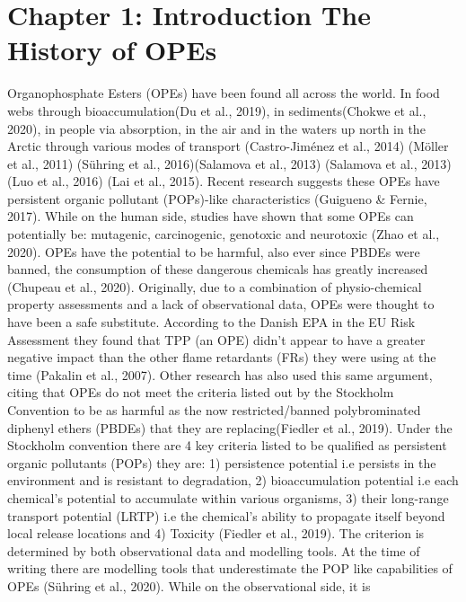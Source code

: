 \documentclass[journal=jacsat,manuscript=article]{achemso}
\begin{document}
\hypertarget{chapter-1-introduction-the-history-of-opes}{%
\section{Chapter 1: Introduction The History of
OPEs}\label{chapter-1-introduction-the-history-of-opes}}

Organophosphate Esters (OPEs) have been found all across the world. In
food webs through bioaccumulation(Du et al., 2019), in sediments(Chokwe
et al., 2020), in people via absorption, in the air and in the waters up
north in the Arctic through various modes of transport (Castro-Jiménez
et al., 2014) (Möller et al., 2011) (Sühring et al., 2016)(Salamova et
al., 2013) (Salamova et al., 2013) (Luo et al., 2016) (Lai et al.,
2015). Recent research suggests these OPEs have persistent organic
pollutant (POPs)-like characteristics (Guigueno \& Fernie, 2017). While
on the human side, studies have shown that some OPEs can potentially be:
mutagenic, carcinogenic, genotoxic and neurotoxic (Zhao et al., 2020).
OPEs have the potential to be harmful, also ever since PBDEs were
banned, the consumption of these dangerous chemicals has greatly
increased (Chupeau et al., 2020). Originally, due to a combination of
physio-chemical property assessments and a lack of observational data,
OPEs were thought to have been a safe substitute. According to the
Danish EPA in the EU Risk Assessment they found that TPP (an OPE) didn't
appear to have a greater negative impact than the other flame retardants
(FRs) they were using at the time (Pakalin et al., 2007). Other research
has also used this same argument, citing that OPEs do not meet the
criteria listed out by the Stockholm Convention to be as harmful as the
now restricted/banned polybrominated diphenyl ethers (PBDEs) that they
are replacing(Fiedler et al., 2019). Under the Stockholm convention
there are 4 key criteria listed to be qualified as persistent organic
pollutants (POPs) they are: 1) persistence potential i.e persists in the
environment and is resistant to degradation, 2) bioaccumulation
potential i.e each chemical's potential to accumulate within various
organisms, 3) their long-range transport potential (LRTP) i.e the
chemical's ability to propagate itself beyond local release locations
and 4) Toxicity (Fiedler et al., 2019). The criterion is determined by
both observational data and modelling tools. At the time of writing
there are modelling tools that underestimate the POP like capabilities
of OPEs (Sühring et al., 2020). While on the observational side, it is
\end{document}

